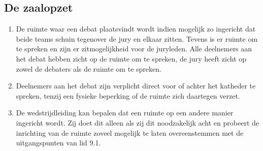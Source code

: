 \subsection{De zaalopzet }

\begin{enumerate}
\item De ruimte waar een debat plaatsvindt wordt indien mogelijk zo ingericht dat beide teams schuin tegenover de jury en elkaar zitten. Tevens is er ruimte om te spreken en zijn er zitmogelijkheid voor de juryleden. Alle deelnemers aan het debat hebben zicht op de ruimte om te spreken, de jury heeft zicht op zowel de debaters als de ruimte om te spreken. 
\item Deelnemers aan het debat zijn verplicht direct voor of achter het katheder te spreken, tenzij een fysieke beperking of de ruimte zich daartegen verzet.
\item De wedstrijdleiding kan bepalen dat een ruimte op een andere manier ingericht wordt. Zij doet dit alleen als zij dit noodzakelijk acht en probeert de inrichting van de ruimte zoveel mogelijk te laten overeenstemmen met de uitgangspunten van lid 9.1.
\end{enumerate}

